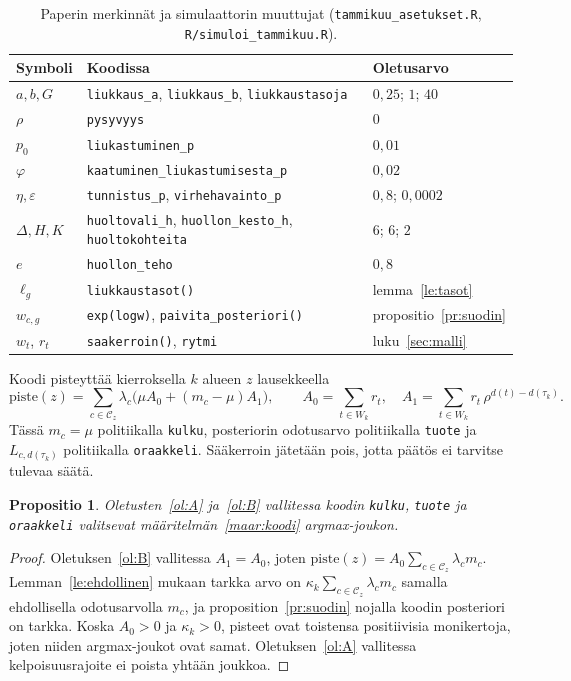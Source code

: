 \documentclass[11pt,a4paper]{article}
\theoremstyle{plain}
\newtheorem{propositio}{Propositio}
\theoremstyle{definition}
\theoremstyle{remark}
\newcommand{\cC}{\mathcal{C}}
\newcommand{\1}{\mathbf{1}}
\newcommand{\pol}[1]{\texttt{#1}}
\begin{document}
\begin{table}[ht]
\centering
\small
\begin{tabular}{@{}lll@{}}
\toprule
Symboli & Koodissa & Oletusarvo \\
\midrule
$a, b, G$ & \texttt{liukkaus\_a}, \texttt{liukkaus\_b}, \texttt{liukkaustasoja} & $0{,}25$; $1$; $40$ \\
$\rho$ & \texttt{pysyvyys} & $0$ \\
$p_0$ & \texttt{liukastuminen\_p} & $0{,}01$ \\
$\varphi$ & \texttt{kaatuminen\_liukastumisesta\_p} & $0{,}02$ \\
$\eta, \varepsilon$ & \texttt{tunnistus\_p}, \texttt{virhehavainto\_p} & $0{,}8$; $0{,}0002$ \\
$\Delta, H, K$ & \texttt{huoltovali\_h}, \texttt{huollon\_kesto\_h}, \texttt{huoltokohteita} & $6$; $6$; $2$ \\
$e$ & \texttt{huollon\_teho} & $0{,}8$ \\
$\ell_g$ & \texttt{liukkaustasot()} & lemma~\ref{le:tasot} \\
$w_{c,g}$ & \texttt{exp(logw)}, \texttt{paivita\_posteriori()} & propositio~\ref{pr:suodin} \\
$w_t$, $r_t$ & \texttt{saakerroin()}, \texttt{rytmi} & luku~\ref{sec:malli} \\
\bottomrule
\end{tabular}
\caption{Paperin merkinnät ja simulaattorin muuttujat (\texttt{tammikuu\_asetukset.R},
\texttt{R/simuloi\_tammikuu.R}).}
\label{tab:parametrit}
\end{table}

Koodi pisteyttää kierroksella $k$ alueen $z$ lausekkeella
\[
  \mathrm{piste}(z) = \sum_{c \in \cC_z}\lambda_c\bigl(\mu A_0 + (m_c - \mu)A_1\bigr),
  \qquad A_0 = \sum_{t \in W_k} r_t,\quad A_1 = \sum_{t \in W_k} r_t\,\rho^{d(t) - d(\tau_k)}.
\]
Tässä $m_c = \mu$ politiikalla \pol{kulku}, posteriorin odotusarvo politiikalla
\pol{tuote} ja $L_{c,d(\tau_k)}$ politiikalla \pol{oraakkeli}. Sääkerroin
jätetään pois, jotta päätös ei tarvitse tulevaa säätä.

\begin{propositio}
Oletusten~\ref{ol:A} ja~\ref{ol:B} vallitessa koodin \pol{kulku}, \pol{tuote} ja
\pol{oraakkeli} valitsevat määritelmän~\ref{maar:koodi} argmax-joukon.
\end{propositio}

\begin{proof}
Oletuksen~\ref{ol:B} vallitessa $A_1 = A_0$, joten
$\mathrm{piste}(z) = A_0\sum_{c \in \cC_z}\lambda_c m_c$. Lemman~\ref{le:ehdollinen}
mukaan tarkka arvo on $\kappa_k\sum_{c \in \cC_z}\lambda_c m_c$ samalla
ehdollisella odotusarvolla $m_c$, ja proposition~\ref{pr:suodin} nojalla koodin
posteriori on tarkka. Koska $A_0 > 0$ ja $\kappa_k > 0$, pisteet ovat toistensa
positiivisia monikertoja, joten niiden argmax-joukot ovat samat.
Oletuksen~\ref{ol:A} vallitessa kelpoisuusrajoite ei poista yhtään joukkoa.
\end{proof}
\end{document}

